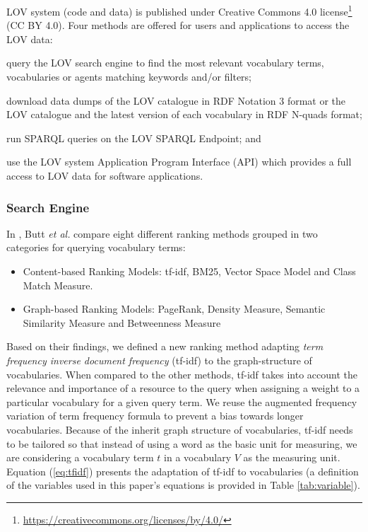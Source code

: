 \documentclass{iosart2c}
\begin{document}
LOV system (code and data) is published under Creative Commons 4.0 license\footnote{\url{https://creativecommons.org/licenses/by/4.0/}} (CC BY 4.0). Four methods are offered for users and applications to access the LOV data:
		\begin{inparaenum}[1)] 
			\item query the LOV search engine to find the most relevant vocabulary terms, vocabularies or agents matching keywords and/or filters;
			\item download data dumps of the LOV catalogue in RDF Notation 3 format or the LOV catalogue and the latest version of each vocabulary in RDF N-quads format;
			\item run SPARQL queries on the LOV SPARQL Endpoint; and
			\item use the LOV system Application Program Interface (API) which provides a full access to LOV data for software applications.
		\end{inparaenum}


\subsubsection{Search Engine}\label{sssec:search}
In \cite{butt2014}, Butt \emph{et al.} compare eight different ranking methods grouped in two categories for querying vocabulary terms:
\begin{itemize}
	\item Content-based Ranking Models: tf-idf, BM25, Vector Space Model and Class Match Measure.
	\item Graph-based Ranking Models: PageRank, Density Measure, Semantic Similarity Measure and Betweenness Measure
\end{itemize}
Based on their findings, we defined a new ranking method adapting \emph{term frequency inverse document frequency} (tf-idf) to the graph-structure of vocabularies. When compared to the other methods, tf-idf takes into account the relevance and importance of a resource to the query when assigning a weight to a particular vocabulary for a given query term. We reuse the augmented frequency variation of term frequency formula to prevent a bias towards longer vocabularies. Because of the inherit graph structure of vocabularies, tf-idf needs to be tailored so that instead of using a word as the basic unit for measuring, we are considering a vocabulary term $t$ in a vocabulary $V$ as the measuring unit. Equation (\ref{eq:tfidf}) presents the adaptation of tf-idf to vocabularies (a definition of the variables used in this paper's equations is provided in Table \ref{tab:variable}). 
\end{document}
